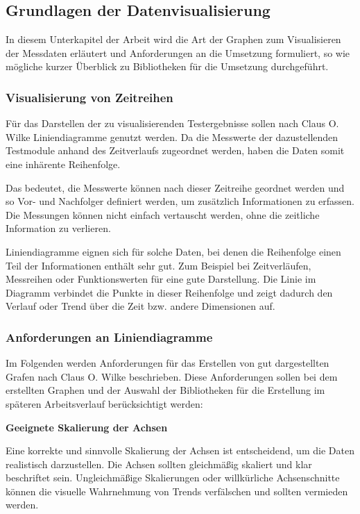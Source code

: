 \subsection{Grundlagen der Datenvisualisierung}
\label{subsec:grundlagen-der-datenvisualisierung}

In diesem Unterkapitel der Arbeit wird die Art der Graphen zum Visualisieren der Messdaten erläutert und Anforderungen an die Umsetzung formuliert,
so wie mögliche kurzer Überblick zu Bibliotheken für die Umsetzung durchgeführt.
\subsubsection{Visualisierung von Zeitreihen}

Für das Darstellen der zu visualisierenden Testergebnisse sollen nach Claus O. Wilke Liniendiagramme genutzt werden.
Da die Messwerte der dazustellenden Testmodule anhand des Zeitverlaufs zugeordnet werden, haben die Daten somit eine inhärente Reihenfolge.

Das bedeutet, die Messwerte können nach dieser Zeitreihe geordnet werden und so Vor- und Nachfolger definiert werden, um zusätzlich Informationen zu erfassen.
Die Messungen können nicht einfach vertauscht werden, ohne die zeitliche Information zu verlieren.

Liniendiagramme eignen sich für solche Daten, bei denen die Reihenfolge einen Teil der Informationen enthält sehr gut.
Zum Beispiel bei Zeitverläufen, Messreihen oder Funktionswerten für eine gute Darstellung.
Die Linie im Diagramm verbindet die Punkte in dieser Reihenfolge und zeigt dadurch den Verlauf oder Trend über die Zeit bzw. andere Dimensionen auf. \cite{Wilke2020Datenvisualisierung}


\subsubsection{Anforderungen an Liniendiagramme}

Im Folgenden werden Anforderungen für das Erstellen von gut dargestellten Grafen nach Claus O. Wilke beschrieben.
Diese Anforderungen sollen bei dem erstellten Graphen und der Auswahl der Bibliotheken für die Erstellung im späteren Arbeitsverlauf berücksichtigt werden: \cite{Wilke2020Datenvisualisierung}

\item
\textbf{Geeignete Skalierung der Achsen}

Eine korrekte und sinnvolle Skalierung der Achsen ist entscheidend, um die Daten realistisch darzustellen.
Die Achsen sollten gleichmäßig skaliert und klar beschriftet sein.
Ungleichmäßige Skalierungen oder willkürliche Achsenschnitte können die visuelle Wahrnehmung von Trends verfälschen und sollten vermieden werden.

